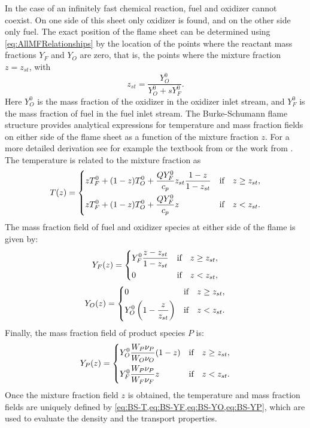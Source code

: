 In the case of an infinitely fast chemical reaction, fuel and oxidizer cannot coexist. On one side of this sheet only oxidizer is found, and on the other side only fuel. The exact position of the flame sheet can be determined  using \cref{eq:AllMFRelationships} by the location of the points where the reactant mass fractions $Y_F$ and $Y_O$ are zero, that is, the points where the mixture fraction $z = z_{st}$, with
\begin{equation}
	z_{st} = \frac{Y_O^0}{Y_O^0+sY_F^0}.
\end{equation}
Here $Y_O^0$ is the mass fraction of the oxidizer in the oxidizer inlet stream, and $Y_F^0$ is the mass fraction of fuel in the fuel inlet stream.
The Burke-Schumann flame structure provides analytical expressions for temperature and mass fraction fields on either side of the flame sheet as a function of the mixture fraction $z$. For a more detailed derivation see for example the textbook from \textcite{poinsotTheoreticalNumericalCombustion2005} or the work from \textcite{keyesFlameSheetStarting1987}.
The temperature is related to the mixture fraction as
\begin{equation}\label{eq:BS-T}
	T(z) =
	\begin{dcases}
		z T_F^0 + (1-z)T_O^0 + \frac{Q Y_F^0}{c_p}z_{st}\frac{1 - z}{1-z_{st}} & \text{if}\quad z \geq z_{st}, \\
		z T_F^0 + (1-z)T_O^0 + \frac{Q Y_F^0}{c_p}z                            & \text{if}\quad z < z_{st}.
	\end{dcases}
\end{equation}
The mass fraction field of fuel and oxidizer species at either side of the flame is given by:
\begin{equation}\label{eq:BS-YF}
	Y_F(z) =
	\begin{dcases}
		Y_F^0\frac{z - z_{st}}{1-z_{st}} & \text{if}\quad z \geq z_{st}, \\
		0                                & \text{if} \quad z < z_{st},
	\end{dcases}
\end{equation}
\begin{equation}\label{eq:BS-YO}
	Y_O(z) =
	\begin{dcases}
		0                                         & \text{if} \quad z \geq z_{st}, \\
		Y_O^0 \left( 1- \frac{z}{z_{st}}  \right) & \text{if} \quad z < z_{st}.
	\end{dcases}
\end{equation}
Finally, the mass fraction field of product species $P$ is:
\begin{equation}\label{eq:BS-YP}
	Y_P(z) =
	\begin{dcases}
		Y_O^0\frac{W_P\nu_P}{W_O\nu_O}(1-z) & \text{if} \quad z \geq z_{st}, \\
		Y_F^0\frac{W_P\nu_P}{W_F\nu_F}z     & \text{if} \quad z < z_{st}.
	\end{dcases}
\end{equation}
Once the mixture fraction field $z$ is obtained, the temperature and mass fraction fields are uniquely defined by \cref{eq:BS-T,eq:BS-YF,eq:BS-YO,eq:BS-YP}, which are used to evaluate the density and the transport properties. 


